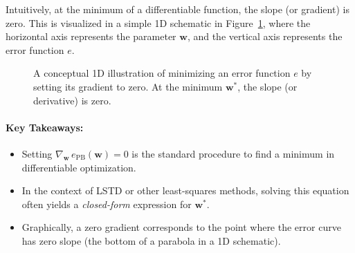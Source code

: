 Intuitively, at the minimum of a differentiable function, the slope (or gradient) is zero. This is
visualized in a simple 1D schematic in Figure~\ref{fig:grad_zero}, where the horizontal axis 
represents the parameter $\boldsymbol{w}$, and the vertical axis represents the error function $e$. 

\begin{figure}[ht]
\centering
{}
\caption{A conceptual 1D illustration of minimizing an error function $e$ by setting its gradient to zero. 
At the minimum $\boldsymbol{w}^*$, the slope (or derivative) is zero.}
\label{fig:grad_zero}
\end{figure}

\paragraph{Key Takeaways:}
\begin{itemize}
    \item Setting $\nabla_{\boldsymbol{w}} \, e_{\mathrm{PB}}(\boldsymbol{w}) = 0$ is the standard procedure to find a minimum in differentiable optimization.
    \item In the context of LSTD or other least-squares methods, solving this equation often yields a \emph{closed-form} expression for $\boldsymbol{w}^*$.
    \item Graphically, a zero gradient corresponds to the point where the error curve has zero slope (the bottom of a parabola in a 1D schematic).
\end{itemize}